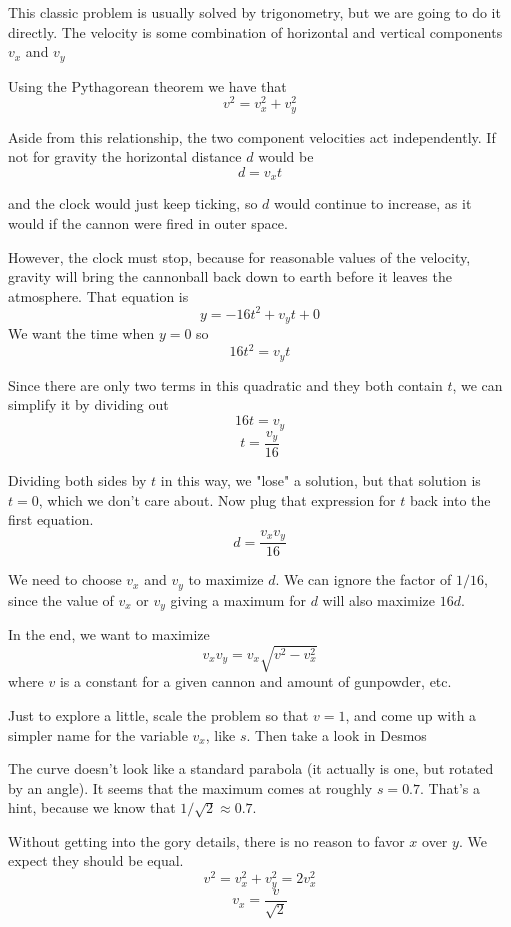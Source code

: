 \documentclass[11pt, oneside]{article}
\begin{document}
This classic problem is usually solved by trigonometry, but we are going to do it directly.  The velocity is some combination of horizontal and vertical components $v_x$ and $v_y$

Using the Pythagorean theorem we have that
\[ v^2 = v_x^2 + v_y^2 \]

Aside from this relationship, the two component velocities act independently.  If not for gravity the horizontal distance $d$ would be 
\[ d = v_x t \]

and the clock would just keep ticking, so $d$ would continue to increase, as it would if the cannon were fired in outer space.

However, the clock must stop, because for reasonable values of the velocity, gravity will bring the cannonball back down to earth before it leaves the atmosphere.  That equation is
\[ y = -16t^2 + v_y t + 0 \]
We want the time when $y = 0$ so
\[ 16t^2 = v_y t \]

Since there are only two terms in this quadratic and they both contain $t$, we can simplify it by dividing out
\[ 16t = v_y \]
\[ t = \frac{v_y}{16} \]

Dividing both sides by $t$ in this way, we "lose" a solution, but that solution is $t = 0$, which we don't care about.  Now plug that expression for $t$ back into the first equation.
\[ d = \frac{v_x v_y}{16} \]

We need to choose $v_x$ and $v_y$ to maximize $d$.  We can ignore the factor of $1/16$, since the value of $v_x$ or $v_y$ giving a maximum for $d$ will also maximize $16d$.

In the end, we want to maximize
\[ v_x v_y = v_x \sqrt{v^2 - v_x^2} \]
where $v$ is a constant for a given cannon and amount of gunpowder, etc.

Just to explore a little, scale the problem so that $v = 1$, and come up with a simpler name for the variable $v_x$, like $s$.  Then take a look in Desmos

The curve doesn't look like a standard parabola (it actually is one, but rotated by an angle).  It seems that the maximum comes at roughly $s = 0.7$.  That's a hint, because we know that $1/\sqrt{2} \approx 0.7$.

Without getting into the gory details, there is no reason to favor $x$ over $y$.  We expect they should be equal.
\[ v^2 = v_x^2 + v_y^2 = 2 v_x^2 \]
\[ v_x = \frac{v}{\sqrt{2}} \]
\end{document}

